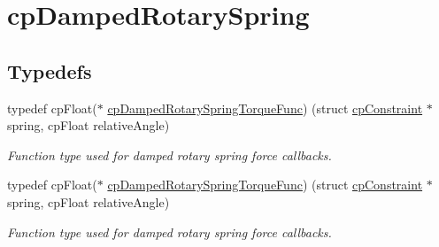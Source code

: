 \hypertarget{group__cpDampedRotarySpring}{}\section{cp\+Damped\+Rotary\+Spring}
\label{group__cpDampedRotarySpring}
\subsection*{Typedefs}
\begin{DoxyCompactItemize}
\item 
\mbox{\label{group__cpDampedRotarySpring_ga072c236959020fab4f30087b5234040b}} 
typedef cp\+Float($\ast$ \hyperlink{group__cpDampedRotarySpring_ga072c236959020fab4f30087b5234040b}{cp\+Damped\+Rotary\+Spring\+Torque\+Func}) (struct \hyperlink{structcpConstraint}{cp\+Constraint} $\ast$spring, cp\+Float relative\+Angle)
\begin{DoxyCompactList}\small\item\em Function type used for damped rotary spring force callbacks. \end{DoxyCompactList}\item 
\mbox{\label{group__cpDampedRotarySpring_ga072c236959020fab4f30087b5234040b}} 
typedef cp\+Float($\ast$ \hyperlink{group__cpDampedRotarySpring_ga072c236959020fab4f30087b5234040b}{cp\+Damped\+Rotary\+Spring\+Torque\+Func}) (struct \hyperlink{structcpConstraint}{cp\+Constraint} $\ast$spring, cp\+Float relative\+Angle)
\begin{DoxyCompactList}\small\item\em Function type used for damped rotary spring force callbacks. \end{DoxyCompactList}\end{DoxyCompactItemize}
